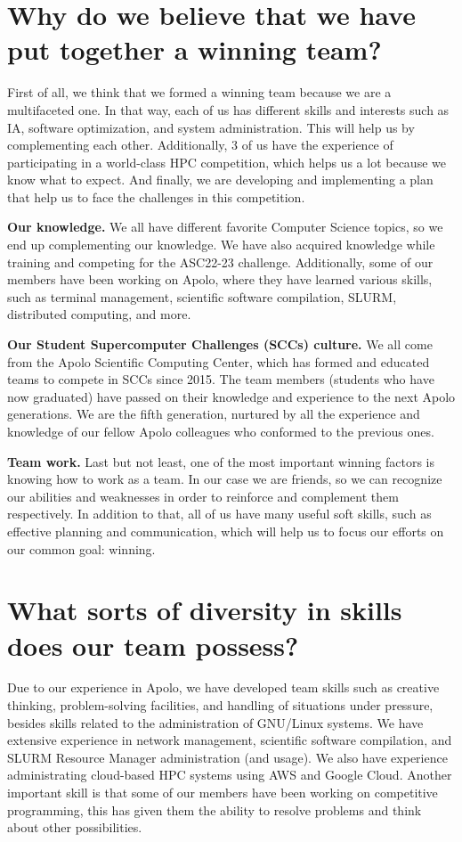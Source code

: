 \documentclass[11pt,a4paper,twocolumn]{article}
\begin{document}
\section{Why do we believe that we have put together a winning team?}

First of all, we think that we formed a winning team because we are a multifaceted one. In that way, each of us has different skills and interests such as IA, software optimization, and system administration. This will help us by complementing each other. Additionally, 3 of us have the experience of participating in a world-class HPC competition, which helps us a lot because we know what to expect. And finally, we are developing and implementing a plan that help us to face the challenges in this competition.

\textbf{Our knowledge.} We all have different favorite Computer Science topics, so we end up complementing our knowledge. We have also acquired knowledge while training and competing for the ASC22-23 challenge. Additionally, some of our members have been working on Apolo, where they have learned various skills, such as terminal management, scientific software compilation, SLURM, distributed computing, and more.

\textbf{Our Student Supercomputer Challenges (SCCs) culture.} We all come from the Apolo Scientific Computing Center, which has formed and educated teams to compete in SCCs since 2015. The team members (students who have now graduated) have passed on their knowledge and experience to the next Apolo generations. We are the fifth generation, nurtured by all the experience and knowledge of our fellow Apolo colleagues who conformed to the previous ones.

\textbf{Team work.} Last but not least, one of the most important winning factors is knowing how to work as a team. In our case we are friends, so we can recognize our abilities and weaknesses in order to reinforce and complement them respectively. In addition to that, all of us have many useful soft skills, such as effective planning and communication, which will help us to focus our efforts on our common goal: winning.

\section{What sorts of diversity in skills does our team possess?}

Due to our experience in Apolo, we have developed team skills such as creative thinking, problem-solving facilities, and handling of situations under pressure, besides skills related to the administration of GNU/Linux systems. We have extensive experience in network management, scientific software compilation, and SLURM Resource Manager administration (and usage). We also have experience administrating cloud-based HPC systems using AWS and Google Cloud. Another important skill is that some of our members have been working on competitive programming, this has given them the ability to resolve problems and think about other possibilities.
\end{document}
